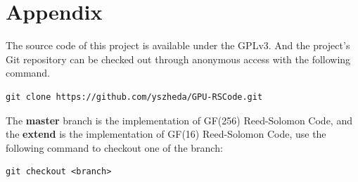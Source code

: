 \documentclass[a4paper]{article}
\begin{document}
\section{Appendix}

The source code of this project is available under the GPLv3. And the project's Git repository can be checked out through anonymous access with the following command.
\begin{verbatim}
git clone https://github.com/yszheda/GPU-RSCode.git
\end{verbatim}

The \textbf{master} branch is the implementation of GF(256) Reed-Solomon Code, and the \textbf{extend} is the implementation of GF(16) Reed-Solomon Code, use the following command to checkout one of the branch:
\begin{verbatim}
git checkout <branch>
\end{verbatim}





\end{document}
